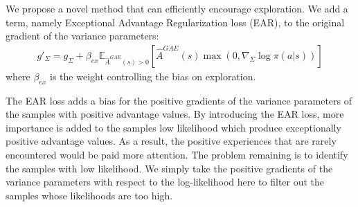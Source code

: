 We propose a novel method that can efficiently encourage exploration. We add a term, namely Exceptional Advantage Regularization loss (EAR), to the original gradient of the variance parameters:
\begin{align}
g'_\Sigma = g_\Sigma + \beta_{ex} \mathbb{E}_{\hat{A}^{GAE}(s) > 0} \left[
\hat{A}^{GAE}(s) 
\max\left(0,\nabla_\Sigma \log \pi (a|s)\right)\right]
\end{align}
where $\beta_{ex} $ is the weight controlling the bias on exploration.

The EAR loss adds a bias for the positive gradients of the variance parameters of the samples with positive advantage values. By introducing the EAR loss, more importance is added to the samples low likelihood which produce exceptionally positive advantage values. As a result, the positive experiences that are rarely encountered would be paid more attention. The problem remaining is to identify the samples with low likelihood. We simply take the positive gradients of the variance parameters with respect to the log-likelihood here to filter out the samples whose likelihoods are too high.
